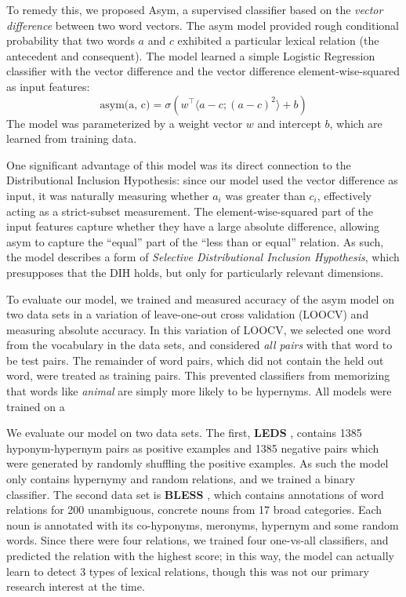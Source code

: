 \documentclass[letterpaper]{article}
\begin{document}
To remedy this, we proposed Asym, a supervised classifier based on the
{\em vector difference} between two word vectors. The asym model provided
rough conditional probability that two words $a$ and $c$ exhibited a particular
lexical relation (the antecedent and consequent). The model learned a simple
Logistic Regression classifier with the vector difference and the vector
difference element-wise-squared as input features:
\begin{equation*}
  \text{asym({a}, {c})} = \sigma\left({w}^\top \langle{a} - {c}; ({a} - {c})^2\rangle + b\right)
\end{equation*}
The model was parameterized by a weight vector $w$ and intercept $b$, which are
learned from training data.

One significant advantage of this model was its direct connection to the
Distributional Inclusion Hypothesis: since our model used the vector difference
as input, it was naturally measuring whether $a_i$ was greater than $c_i$,
effectively acting as a strict-subset measurement. The element-wise-squared
part of the input features capture whether they have a large absolute difference,
allowing asym to capture the ``equal'' part of the ``less than or equal''
relation. As such, the model describes a form of {\em Selective Distributional
Inclusion Hypothesis}, which presupposes that the DIH holds, but only for
particularly relevant dimensions.

To evaluate our model, we trained and measured accuracy of the asym model on
two data sets in a variation of leave-one-out cross validation (LOOCV) and
measuring absolute accuracy. In this variation of LOOCV, we selected one word
from the vocabulary in the data sets, and considered {\em all pairs} with that
word to be test pairs. The remainder of word pairs, which did not contain the
held out word, were treated as training pairs. This prevented classifiers from
memorizing that words like {\em animal} are simply more likely to be hypernyms.
All models were trained on a 

We evaluate our model on two data sets. The first, {\bf LEDS}
\cite{baroni:2012:eacl}, contains 1385 hyponym-hypernym pairs as positive
examples and 1385 negative pairs which were generated by randomly shuffling the
positive examples. As such the model only contains hypernymy and random
relations, and we trained a binary classifier.  The second data set is {\bf
BLESS} \cite{baroni:2011:gems}, which contains annotations  of word relations
for 200 unambiguous, concrete nouns from 17 broad categories. Each noun is
annotated with its co-hyponyms, meronyms, hypernym and some random words. Since
there were four relations, we trained four one-vs-all classifiers, and
predicted the relation with the highest score; in this way, the model
can actually learn to detect 3 types of lexical relations, though this
was not our primary research interest at the time.
\end{document}
